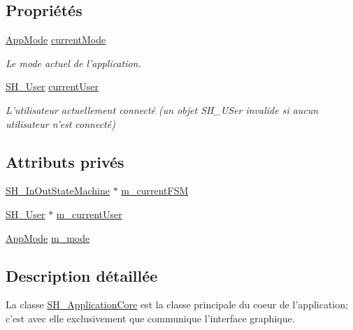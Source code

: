 \subsection*{Propriétés}
\begin{DoxyCompactItemize}
\item 
\hyperlink{classSH__ApplicationCore_a6b93b2f83a290305f282616eb2935899}{App\-Mode} \hyperlink{classSH__ApplicationCore_ac83ee9ad9c649105eb8eac5fac74b951}{current\-Mode}
\begin{DoxyCompactList}\small\item\em Le mode actuel de l'application. \end{DoxyCompactList}\item 
\hyperlink{classSH__User}{S\-H\-\_\-\-User} \hyperlink{classSH__ApplicationCore_aaa2609e7bcda83fd65b602e7e211b027}{current\-User}
\begin{DoxyCompactList}\small\item\em L'utilisateur actuellement connecté (un objet S\-H\-\_\-\-U\-Ser invalide si aucun utilisateur n'est connecté) \end{DoxyCompactList}\end{DoxyCompactItemize}
\subsection*{Attributs privés}
\begin{DoxyCompactItemize}
\item 
\hyperlink{classSH__InOutStateMachine}{S\-H\-\_\-\-In\-Out\-State\-Machine} $\ast$ \hyperlink{classSH__ApplicationCore_a8e550daf4a5d49d88714b716953e4957}{m\-\_\-current\-F\-S\-M}
\item 
\hyperlink{classSH__User}{S\-H\-\_\-\-User} $\ast$ \hyperlink{classSH__ApplicationCore_a2bd2432939b96af2a1003630df83da63}{m\-\_\-current\-User}
\item 
\hyperlink{classSH__ApplicationCore_a6b93b2f83a290305f282616eb2935899}{App\-Mode} \hyperlink{classSH__ApplicationCore_ab2bb2bdb19e4969dee699e0d4ae33e25}{m\-\_\-mode}
\end{DoxyCompactItemize}


\subsection{Description détaillée}
La classe \hyperlink{classSH__ApplicationCore}{S\-H\-\_\-\-Application\-Core} est la classe principale du coeur de l'application; c'est avec elle exclusivement que communique l'interface graphique. 

